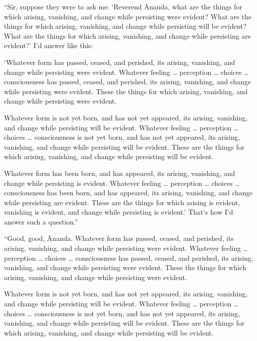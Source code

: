 \documentclass[12pt,openany]{book}%
\begin{document}
“Sir, suppose they were to ask me: ‘Reverend Ānanda, what are the things for which arising, vanishing, and change while persisting were evident? What are the things for which arising, vanishing, and change while persisting will be evident? What are the things for which arising, vanishing, and change while persisting are evident?’ I’d answer like this: 

‘Whatever form has passed, ceased, and perished, its arising, vanishing, and change while persisting were evident. Whatever feeling … perception … choices … consciousness has passed, ceased, and perished, its arising, vanishing, and change while persisting were evident. These the things for which arising, vanishing, and change while persisting were evident. 

Whatever form is not yet born, and has not yet appeared, its arising, vanishing, and change while persisting will be evident. Whatever feeling … perception … choices … consciousness is not yet born, and has not yet appeared, its arising, vanishing, and change while persisting will be evident. These are the things for which arising, vanishing, and change while persisting will be evident. 

Whatever form has been born, and has appeared, its arising, vanishing, and change while persisting is evident. Whatever feeling … perception … choices … consciousness has been born, and has appeared, its arising, vanishing, and change while persisting are evident. These are the things for which arising is evident, vanishing is evident, and change while persisting is evident.’ That’s how I’d answer such a question.” 

“Good, good, Ānanda. Whatever form has passed, ceased, and perished, its arising, vanishing, and change while persisting were evident. Whatever feeling … perception … choices … consciousness has passed, ceased, and perished, its arising, vanishing, and change while persisting were evident. These the things for which arising, vanishing, and change while persisting were evident. 

Whatever form is not yet born, and has not yet appeared, its arising, vanishing, and change while persisting will be evident. Whatever feeling … perception … choices … consciousness is not yet born, and has not yet appeared, its arising, vanishing, and change while persisting will be evident. These are the things for which arising, vanishing, and change while persisting will be evident. 
\end{document}
